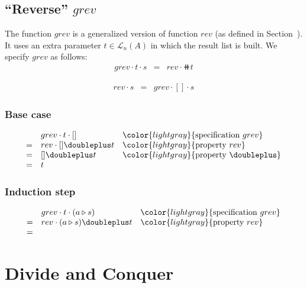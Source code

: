 \documentclass[onesided]{memoir}
\begin{document}
        \section{``Reverse'' $grev$} \label{general:grev}
        The function $grev$ is a generalized version of function $rev$ (as defined in Section~\label{function:rev}). It uses an extra parameter $t \in \mathcal{L}_n(A)$ in which the result list is built.
        We specify $grev$ as follows:
        \begin{displaymath}\begin{array}{lll}
            grev \cdot t \cdot s & = & rev \cdot \doubleplus t
        \end{array}\end{displaymath}
        
        \begin{displaymath}\begin{array}{lll}
            rev \cdot s & = & grev \cdot [] \cdot s
        \end{array}\end{displaymath}
        
        \subsection{Base case}
        \begin{displaymath}\begin{array}{lll}
              & grev \cdot t \cdot [] & \color{lightgray}{\textrm{specification~} grev} \\
            = & rev \cdot [] \doubleplus t & \color{lightgray}{\textrm{property~} rev}\\
            = & [] \doubleplus t & \color{lightgray}{\textrm{property~} \doubleplus}\\
            = & t & 
        \end{array}\end{displaymath}
        
        \subsection{Induction step}
        \begin{displaymath}\begin{array}{lll}
          & grev \cdot t \cdot (a \triangleright s) & \color{lightgray}{\textrm{specification~} grev} \\
        = & rev \cdot (a \triangleright s ) \doubleplus t & \color{lightgray}{\textrm{property~} rev}\\
        = & & 
        \end{array}\end{displaymath}
        
    \chapter{Divide and Conquer} \newpage \pagecolor{white}
\end{document}
